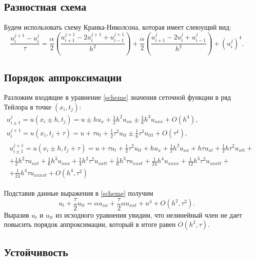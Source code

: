 \documentclass[a4paper,12pt]{article}
\begin{document}
\subsection*{Разностная схема}
Будем использовать схему Кранка-Николсона, которая имеет слеюущий вид:
\begin{equation}\label{scheme}
  \frac{u_{i}^{j+1}-u_{i}^{j}}{\tau}=\frac{\alpha}{2}\left(\frac{u_{i+1}^{j+1}-2u_{i}^{j+1}+u_{i-1}^{j+1}}{h^2}\right) + \frac{\alpha}{2}\left(\frac{u_{i+1}^{j}-2u_{i}^{j}+u_{i-1}^{j}}{h^2}\right) + \left(u_{i}^{j}\right)^4.
\end{equation}

\subsection*{Порядок аппроксимации}

Разложим входящие в уравнение \cref{scheme} значения сеточной функции в ряд Тейлора в точке \((x_i, t_j)\):
\begin{gather*}
  u_{i\pm1}^{j}=u(x_{i}\pm h, t_{j})=u \pm h u_x +\frac{1}{2} h^2 u_{xx} \pm \frac{1}{6} h^3 u_{xxx} + O(h^{4}),\\
  u_{i}^{j+1}=u(x_{i}, t_{j}+\tau)=u + \tau u_t +\frac{1}{2} \tau^2 u_{tt} \pm \frac{1}{6} \tau^3 u_{ttt} + O(\tau^{4}),\\
  \begin{split}
    u_{i\pm1}^{j+1}=u(x_{i}\pm h,t_{j}+\tau)=u+\tau  u_t+\frac{1}{2} \tau ^2 u_{tt}+h u_x+\frac{1}{2} h^2 u_{xx}+h \tau  u_{xt}+\frac{1}{2} h \tau ^2 u_{xtt}+\\
    +\frac{1}{2} h^2 \tau  u_{xxt}+\frac{1}{6} h^3 u_{xxx}+\frac{1}{4} h^2 \tau ^2 u_{xxtt}+\frac{1}{6} h^3 \tau  u_{xxxt}+\frac{1}{24} h^4 u_{xxxx}+\frac{1}{12} h^3 \tau ^2 u_{xxxtt}+\\
    +\frac{1}{24} h^4 \tau  u_{xxxxt}+O(h^4, \tau^2)
  \end{split}
\end{gather*}

Подставив данные выражения в \cref{scheme} получим
\begin{equation*}
  u_{t}+\frac{\tau}{2} u_{tt} = \alpha u_{xx} + \frac{\tau}{2} \alpha u_{xxt} + u^4 + O(h^2, \tau^2).
\end{equation*}
Выразив \(u_{t}\) и \(u_{tt}\) из исходного уравнения увидим, что нелинейный член не дает повысить порядок аппроксимации, который в итоге равен \(O(h^2, \tau)\).

\subsection*{Устойчивость}
\end{document}
